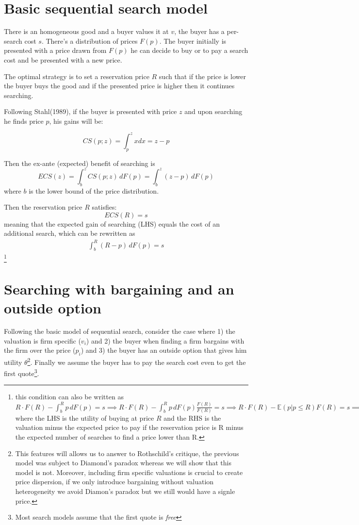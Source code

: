 \documentclass[12pt]{article}
\theoremstyle{plain}
\theoremstyle{plain}
\begin{document}
 


\section{Basic sequential search model}

There is an homogeneous good and a  buyer values it at $v$, the buyer has a per-search cost $s$. There's a distribution of prices $F(p)$. The buyer initially is presented with a price drawn from $F(p)$ he can decide to buy or to pay a search cost and be presented with a new price. 

The optimal strategy is to set a reservation price $R$ such that if the price is lower the buyer buys the good and if the presented price is higher then it continues searching. 


Following Stahl(1989), if the buyer is presented with price $z$ and upon searching he finds price $p$, his gains will be: 

$$
CS(p; z) = \int_p^z x dx  = z-p
$$

Then the ex-ante (expected) benefit of searching is
\[
ECS(z) = \int_b^z CS(p; z)\, dF(p)
= \int_b^z (z - p)\, dF(p)
\]
where $b$ is the lower bound of the price distribution. 

Then the reservation price $R$ satisfies:
$$ECS(R) = s$$
meaning that the expected gain of searching (LHS) equals the cost of an additional search, which can be rewritten as 
\begin{align}\label{eq:sequential1}
     \int_b^R (R - p)\, dF(p) = s 
\end{align}\footnote{this condition can also be written as $R \cdot F(R) - \int_b^R p\, dF(p)
= s
 \implies R \cdot F(R) - \int_b^R p\, dF(p)  \frac{F(R)}{F(R)}
= s  \implies R \cdot F(R) - \mathbb{E}(p|p\leq R) F(R) = s \implies R = \mathbb{E}(p|p\leq R) +  \frac{s}{F(R)} \implies v-R = v- \mathbb{E}(p|p\leq R) -  \frac{s}{F(R)}  $ where the LHS is the utility of buying at price $R$ and the RHS is the valuation minus the expected price to pay if the reservation price is R minus the expected number of searches to find a price lower than R. }


\section{Searching with bargaining and an outside option}


Following the basic model of sequential search, consider the case where 1) the valuation is firm specific ($v_i$) and 2) the buyer when finding a firm bargains with the firm over the price ($p_i$) and 3) the buyer has an outside option that gives him utility $\theta$\footnote{This features will allows us to answer to Rothschild's critique, the previous model was subject to Diamond's paradox whereas we will show that this model is not. Moreover, including firm specific valuations  is crucial to create price dispersion, if we only introduce bargaining without valuation heterogeneity we avoid Diamon's paradox but we still would have a signle price. }. Finally we assume the buyer has to pay the search cost even to get the first quote\footnote{Most search models assume that the first quote is \textit{free}}. 
\end{document}

